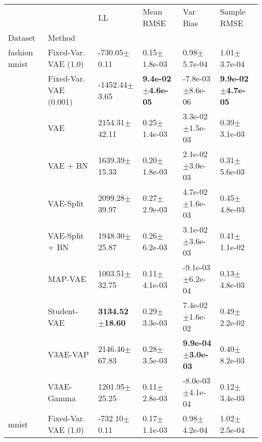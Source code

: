 \begin{tabular}{llllll}
\toprule
             &     &                           LL &                     Mean RMSE &                       Var Bias &                   Sample RMSE \\
Dataset & Method &                              &                               &                                &                               \\
\midrule
fashion mnist & Fixed-Var. VAE (1.0) &             -730.05$\pm$0.11 &              0.15$\pm$1.8e-03 &               0.98$\pm$5.7e-04 &              1.01$\pm$3.7e-04 \\
             & Fixed-Var. VAE (0.001) &            -1452.44$\pm$3.65 &  \textbf{9.4e-02$\pm$4.6e-05} &           -7.8e-03$\pm$8.6e-06 &  \textbf{9.9e-02$\pm$4.7e-05} \\
             & VAE &            2154.31$\pm$42.11 &              0.25$\pm$1.4e-03 &            3.3e-02$\pm$1.5e-03 &              0.39$\pm$3.1e-03 \\
             & VAE + BN &            1639.39$\pm$15.33 &              0.20$\pm$1.8e-03 &            2.1e-02$\pm$3.0e-03 &              0.31$\pm$5.6e-03 \\
             & VAE-Split &            2099.28$\pm$39.97 &              0.27$\pm$2.9e-03 &            4.7e-02$\pm$1.6e-03 &              0.45$\pm$4.8e-03 \\
             & VAE-Split + BN &            1948.30$\pm$25.87 &              0.26$\pm$6.2e-03 &            3.1e-02$\pm$3.6e-03 &              0.41$\pm$1.1e-02 \\
             & MAP-VAE &            1003.51$\pm$32.75 &              0.11$\pm$4.1e-03 &           -9.1e-03$\pm$6.2e-04 &              0.13$\pm$4.8e-03 \\
             & Student-VAE &   \textbf{3134.52$\pm$18.60} &              0.29$\pm$3.3e-03 &            7.4e-02$\pm$1.6e-02 &              0.49$\pm$2.2e-02 \\
             & V3AE-VAP &            2146.46$\pm$67.83 &              0.28$\pm$3.5e-03 &   \textbf{9.9e-04$\pm$3.0e-03} &              0.40$\pm$8.2e-03 \\
             & V3AE-Gamma &            1201.95$\pm$25.25 &              0.11$\pm$2.8e-03 &           -8.0e-03$\pm$4.1e-04 &              0.12$\pm$3.4e-03 \\
mnist & Fixed-Var. VAE (1.0) &             -732.10$\pm$0.11 &              0.17$\pm$1.1e-03 &               0.98$\pm$4.2e-04 &              1.02$\pm$2.5e-04 \\

\end{tabular}
